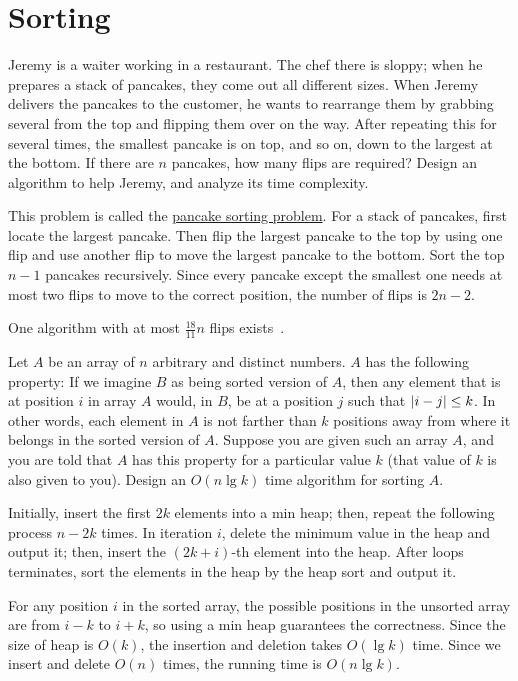 \section{Sorting}

\begin{Exercise}[title={Pancake sorting problem},origin={NCKU CSIE 102},difficulty=1]
Jeremy is a waiter working in a restaurant. The chef there is sloppy; when he prepares a stack of pancakes, they come out all different sizes. When Jeremy delivers the pancakes to the customer, he wants to rearrange them by grabbing several from the top and flipping them over on the way. After repeating this for several times, the smallest pancake is on top, and so on, down to the largest at the bottom. If there are $n$ pancakes, how many flips are required? Design an algorithm to help Jeremy, and analyze its time complexity.
\end{Exercise}
\begin{Answer}
This problem is called the \href{https://en.wikipedia.org/wiki/Pancake_sorting}{pancake sorting problem}. For a stack of pancakes, first locate the largest pancake. Then flip the largest pancake to the top by using one flip and use another flip to move the largest pancake to the bottom. Sort the top $n-1$ pancakes recursively. Since every pancake except the smallest one needs at most two flips to move to the correct position, the number of flips is $2n - 2$.

\begin{remark}
One algorithm with at most $\frac{18}{11}n$ flips exists~\cite{Chitturi2009}.
\end{remark}
\end{Answer}

\begin{Exercise}[origin={NTUT CSIE 95}]
Let $A$ be an array of $n$ arbitrary and distinct numbers. $A$ has the following property: If we imagine $B$ as being sorted version of $A$, then any element that is at position $i$ in array $A$ would, in $B$, be at a position $j$ such that $\lvert i - j\rvert \leq k$. In other words, each element in $A$ is not farther than $k$ positions away from where it belongs in the sorted version of $A$. Suppose you are given such an array $A$, and you are told that $A$ has this property for a particular value $k$ (that value of $k$ is also given to you). Design an $O(n \lg k)$ time algorithm for sorting $A$.
\end{Exercise}
\begin{Answer}
Initially, insert the first $2k$ elements into a min heap; then, repeat the following process $n - 2k$ times. In iteration $i$, delete the minimum value in the heap and output it; then, insert the $(2k + i)$-th element into the heap. After loops terminates, sort the elements in the heap by the heap sort and output it.

For any position $i$ in the sorted array, the possible positions in the unsorted array are from $i - k$ to $i + k$, so using a min heap guarantees the correctness. 
Since the size of heap is $O(k)$, the insertion and deletion takes $O(\lg k)$ time. 
Since we insert and delete $O(n)$ times, the running time is $O(n \lg k)$.
\end{Answer}

